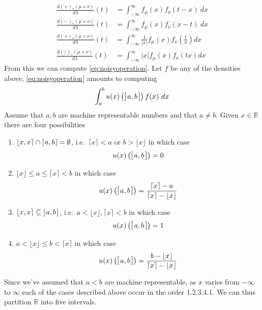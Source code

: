 \documentclass[10pt,a4paper]{article}
\theoremstyle{plain}
\theoremstyle{definition}
\newcommand{\R}{\mathbb{R}}
\newcommand{\ceil}[1]{\lceil #1 \rceil}
\newcommand{\floor}[1]{\lfloor #1 \rfloor}
\newcommand{\intvl}[1]{\mathlarger{\left[\right.}  #1 \mathlarger{\left.\right]}}
\newcommand{\fintvl}[1][x]{\mathlarger{\lfloor}#1,#1\mathlarger{\rceil}}
\newcommand{\absv}[1]{\vert #1\vert}
\begin{document}
\begin{align}
\frac{d(+)_\ast(\mu\times\nu)}{d\lambda}(t)&=\int_{-\infty}^{\infty} f_\mu(x)f_\nu(t-x)~dx\label{eq:pdfplus}\\
\frac{d(-)_\ast(\mu\times\nu)}{d\lambda}(t)&=\int_{-\infty}^{\infty} f_\mu(x)f_\nu(x-t)~dx\label{eq:pdfminus}\\
\frac{d(\times)_\ast(\mu\times\nu)}{d\lambda}(t)&=\int_{-\infty}^{\infty} \frac{1}{\absv{x}}f_\mu(x)f_\nu\left(\frac{t}{x}\right)dx\label{eq:pdftimes}\\
\frac{d(/)_\ast(\mu\times\nu)}{d\lambda}(t)&=\int_{-\infty}^{\infty} \absv{x}f_\mu(x)f_\nu(tx)dx\label{eq:pdfdiv}
\end{align}
From this we can compute \eqref{eq:noisyoperation}. Let $f$ be any of the densities above, \eqref{eq:noisyoperation} amounts to computing
\[
\int_a^b u(x)\left(\intvl{a,b}\right) f(x) ~dx
\]
Assume that $a,b$ are machine representable numbers and that $a\neq b$. Given $x\in \R$ there are four possibilities
\begin{enumerate}
\item $\fintvl \cap \intvl{a,b}=\emptyset$, i.e.\ $\ceil{x}<a$ or $b>\floor{x}$ in which case 
\[
u(x)\left(\intvl{a,b}\right)=0
\]
\item  $\floor{x}\leq a\leq \ceil{x}<b$ in which case
\[
u(x)\left(\intvl{a,b}\right)=\frac{\ceil{x}-a}{\ceil{x}-\floor{x}}
\]
\item $\fintvl \subseteq \intvl{a,b}$, i.e.\ $a<\floor{x}, \ceil{x}<b$ in which case
\[
u(x)\left(\intvl{a,b}\right)=1
\]
\item  $a< \floor{x}\leq b<\ceil{x}$ in which case
\[
u(x)\left(\intvl{a,b}\right)=\frac{b-\floor{x}}{\ceil{x}-\floor{x}}
\]
\end{enumerate}
Since we've assumed that $a<b$ are machine representable, as $x$ varies from $-\infty$ to $\infty$ each of the cases described above occur in the order 1.2.3.4.1. We can thus partition $\R$ into five intervals. 
\end{document}

